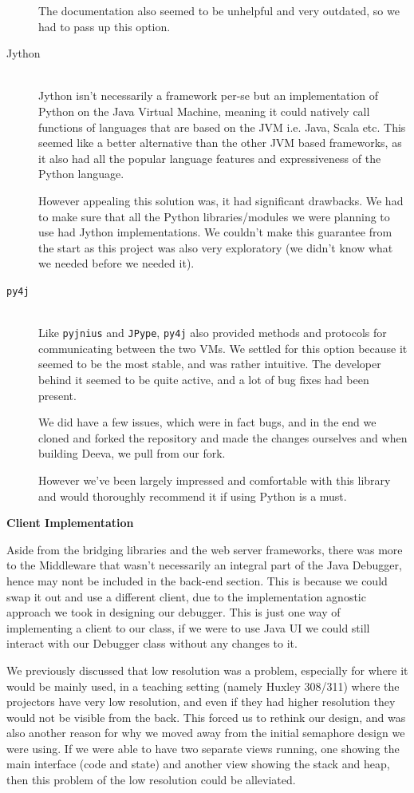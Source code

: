 \documentclass[11pt, a4paper]{article}
\begin{document}
\begin{description}
    The documentation also seemed to be unhelpful and very outdated, so we had
    to pass up this option.
  \item[Jython]\hfill\\
    Jython isn't necessarily a framework per-se but an implementation of Python
    on the Java Virtual Machine, meaning it could natively call functions of
    languages that are based on the JVM i.e. Java, Scala etc. This seemed like a
    better alternative than the other JVM based frameworks, as it also had all
    the popular language features and expressiveness of the Python language.

    However appealing this solution was, it had significant drawbacks. We had to
    make sure that all the Python libraries/modules we were planning to use had
    Jython implementations. We couldn't make this guarantee from the start as
    this project was also very exploratory (we didn't know what we needed before
    we needed it).
  \item[\texttt{py4j}]\hfill\\
    Like \texttt{pyjnius} and \texttt{JPype}, \texttt{py4j} also provided
    methods and protocols for communicating between the two VMs. We settled for
    this option because it seemed to be the most stable, and was rather
    intuitive. The developer behind it seemed to be quite active, and a lot of
    bug fixes had been present.

    We did have a few issues, which were in fact bugs, and in the end we cloned
    and forked the repository and made the changes ourselves and when building
    Deeva, we pull from our fork.

    However we've been largely impressed and comfortable with this library and
    would thoroughly recommend it if using Python is a must.
\end{description}

\textbf{Client Implementation}

Aside from the bridging libraries and the web server frameworks, there was more
to the Middleware that wasn't necessarily an integral part of the Java Debugger,
hence may nont be included in the back-end section. This is because we could
swap it out and use a different client, due to the implementation agnostic
approach we took in designing our debugger. This is just one way of implementing
a client to our class, if we were to use Java UI we could still interact with
our Debugger class without any changes to it.

We previously discussed that low resolution was a problem, especially for where
it would be mainly used, in a teaching setting (namely Huxley 308/311) where the
projectors have very low resolution, and even if they had higher resolution they
would not be visible from the back. This forced us to rethink our design, and
was also another reason for why we moved away from the initial semaphore design
we were using. If we were able to have two separate views running, one showing
the main interface (code and state) and another view showing the stack and heap,
then this problem of the low resolution could be alleviated.
\end{document}

